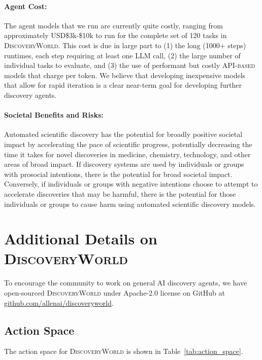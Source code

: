\documentclass{article}
\newcommand{\env}{\textsc{DiscoveryWorld}\xspace}
\begin{document}
\paragraph{Agent Cost:} The agent models that we run are currently quite costly, ranging from approximately USD\$3k-\$10k to run for the complete set of 120 tasks in \env.  This cost is due in large part to (1) the long (1000+ steps) runtimes, each step requiring at least one LLM call, (2) the large number of individual tasks to evaluate, and (3) the use of performant but costly \textsc{API-based} models that charge per token.  We believe that developing inexpensive models that allow for rapid iteration is a clear near-term goal for developing further discovery agents. 

\paragraph{Societal Benefits and Risks:} Automated scientific discovery has the potential for broadly positive societal impact by accelerating the pace of scientific progress, potentially decreasing the time it takes for novel discoveries in medicine, chemistry, technology, and other areas of broad impact.  If discovery systems are used by individuals or groups with prosocial intentions, there is the potential for broad societal impact.  Conversely, if individuals or groups with negative intentions choose to attempt to accelerate discoveries that may be harmful, there is the potential for those individuals or groups to cause harm using automated scientific discovery models.

\section{Additional Details on \env}
\label{sec:appendix_details_discoveryworld}

To encourage the community to work on general AI discovery agents, we have open-sourced \env under Apache-2.0 license on GitHub at \href{https://github.com/allenai/discoveryworld}{github.com/allenai/discoveryworld}.

\subsection{Action Space}
\label{sec:appendix_action_space}

The action space for \env is shown in Table~\ref{tab:action_space}.
\end{document}
